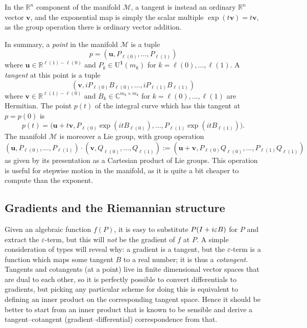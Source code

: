 \documentclass{article}
\newcommand{\C}{\mathbb{C}}
\newcommand{\R}{\mathbb{R}}
\newcommand{\ve}{\varepsilon}
\newcommand{\mc}{\mathcal}
\newcommand{\vek}{\mathbf}
\newcommand{\UOne}{\mathrm{U}^{\vek{1}}}
\theoremstyle{definition}
\begin{document}
In the $\R^n$ component of the manifold $\mc{M}$, a tangent is 
instead an ordinary $\R^n$ vector $\vek{v}$, and the exponential map 
is simply the scalar multiple \(\exp(t\vek{v}) = t\vek{v}\), as the 
group operation there is ordinary vector addition.

In summary, a \emph{point} in the manifold $\mc{M}$ is a tuple
\begin{equation*}
  p = (\vek{u}, P_{\ell(0)}, \dotsc, P_{\ell(1)})
\end{equation*}
where \(\vek{u} \in \R^{\ell(1)-\ell(0)}\) and \(P_k \in \UOne(m_k)\) 
for \(k=\ell(0),\dotsc,\ell(1)\). A \emph{tangent} at this point is a 
tuple
\begin{equation*}
  (\vek{v}, i P_{\ell(0)} B_{\ell(0)}, \dotsc, 
    i P_{\ell(1)} B_{\ell(1)})
\end{equation*}
where \(\vek{v} \in \R^{\ell(1)-\ell(0)}\) and \(B_k \in \C^{m_k 
\times m_k}\) for \(k=\ell(0),\dotsc,\ell(1)\) are Hermitian. The 
point $p(t)$ of the integral curve which has this tangent at \(p = 
p(0)\) is
\begin{equation*}
  p(t) = \bigl( \vek{u} + t\vek{v}, P_{\ell(0)} \exp(itB_{\ell(0)}), 
    \dotsc, P_{\ell(1)} \exp(itB_{\ell(1)}) \bigr)
  \text{.}
\end{equation*}
The manifold $\mc{M}$ is moreover a Lie group, with group operation
\begin{equation*}
  (\vek{u}, P_{\ell(0)}, \dotsc, P_{\ell(1)}) \cdot
  (\vek{v}, Q_{\ell(0)}, \dotsc, Q_{\ell(1)}) :=
  (\vek{u} + \vek{v}, P_{\ell(0)} Q_{\ell(0)}, \dotsc, 
    P_{\ell(1)} Q_{\ell(1)})
\end{equation*}
as given by its presentation as a Cartesian product of Lie groups. 
This operation is useful for stepwise motion in the manifold, as it 
is quite a bit cheaper to compute than the exponent.


\subsection{Gradients and the Riemannian structure}

Given an algebraic function $f(P)$, it is easy to substitute $P(I 
+\nobreak i \ve B)$ for $P$ and extract the $\ve$-term, but this will 
\emph{not} be the gradient of $f$ at $P$. A simple consideration of 
types will reveal why: a gradient is a tangent, but the $\ve$-term is 
a function which maps some tangent $B$ to a real number; it is thus a 
\emph{cotangent}. Tangents and cotangents (at a point) live in finite 
dimensional vector spaces that are dual to each other, so it is 
perfectly possible to convert differentials to gradients, but picking 
any particular scheme for doing this is equivalent to defining an 
inner product on the corresponding tangent space. Hence it should be 
better to start from an inner product that is known to be sensible 
and derive a tangent--cotangent (gradient--differential) 
correspondence from that.
\end{document}
